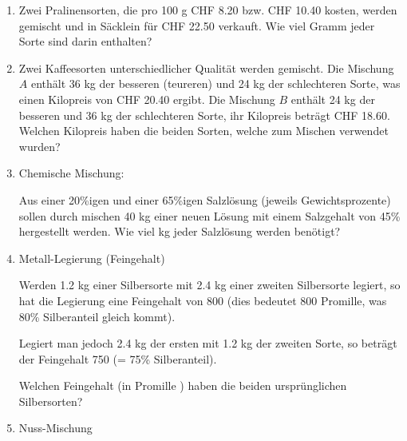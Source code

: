 \begin{enumerate}[label=\alph*)]
\item Zwei Pralinensorten, die pro 100 g CHF 8.20 bzw. CHF 10.40
kosten, werden gemischt und in Säcklein für CHF 22.50 verkauft. Wie
viel Gramm jeder Sorte sind darin enthalten?

\item

Zwei Kaffeesorten unterschiedlicher Qualität werden gemischt. Die
Mischung $A$ enthält 36 kg der besseren (teureren) und 24 kg der
schlechteren Sorte, was einen Kilopreis von CHF 20.40 ergibt. Die
Mischung $B$ enthält 24 kg der besseren und 36 kg der schlechteren
Sorte, ihr Kilopreis beträgt CHF 18.60. Welchen Kilopreis haben die
beiden Sorten, welche zum Mischen verwendet wurden?

\item
Chemische Mischung:

Aus einer 20\%igen und einer
65\%igen Salzlösung (jeweils Gewichtsprozente) sollen durch mischen 40
kg einer neuen Lösung mit einem Salzgehalt von 45\% hergestellt
werden. Wie viel kg jeder Salzlösung werden benötigt?

\item
Metall-Legierung (Feingehalt)

Werden 1.2 kg einer Silbersorte mit 2.4 kg einer zweiten Silbersorte
legiert, so hat die Legierung eine Feingehalt von 800 (dies bedeutet
800 Promille, was 80\% Silberanteil gleich kommt).

Legiert man jedoch 2.4 kg der ersten mit 1.2 kg der zweiten Sorte, so
beträgt der Feingehalt 750 (= 75\% Silberanteil).

Welchen Feingehalt (in Promille \textperthousand) haben die beiden ursprünglichen
Silbersorten?

\item Nuss-Mischung


\end{enumerate}
